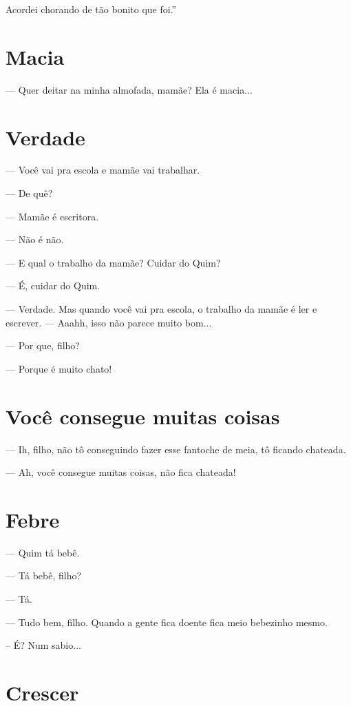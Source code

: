 {{Acordei chorando de tão bonito que foi.''

\chapter{Macia}\label{macia}


--- Quer deitar na minha almofada, mamãe? Ela é macia...

\chapter{Verdade}\label{verdade}

--- Você vai pra escola e mamãe vai trabalhar.

--- De quê?

--- Mamãe é escritora.

--- Não é não.

--- E qual o trabalho da mamãe? Cuidar do Quim?

--- É, cuidar do Quim.

--- Verdade. Mas quando você vai pra escola, o trabalho da mamãe é ler e
escrever.
--- Aaahh, isso não parece muito bom...

--- Por que, filho?

--- Porque é muito chato!

\chapter{Você consegue muitas
coisas}\label{vocuxea-consegue-muitas-coisas}

--- Ih, filho, não tô conseguindo fazer esse fantoche de meia, tô
ficando chateada.

--- Ah, você consegue muitas coisas, não fica chateada!

\chapter{Febre}\label{febre}

--- Quim tá bebê.

--- Tá bebê, filho?

--- Tá.

--- Tudo bem, filho. Quando a gente fica doente fica meio bebezinho
mesmo.

-- É? Num sabio...

\chapter{Crescer}\label{crescer}

}}
